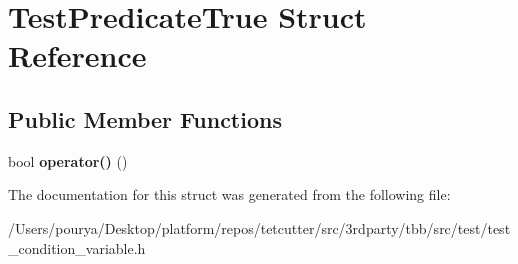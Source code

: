 \hypertarget{structTestPredicateTrue}{}\section{Test\+Predicate\+True Struct Reference}
\label{structTestPredicateTrue}
\subsection*{Public Member Functions}
\begin{DoxyCompactItemize}
\item 
\hypertarget{structTestPredicateTrue_a9887ffb73b4401d56c45b23501a75020}{}bool {\bfseries operator()} ()\label{structTestPredicateTrue_a9887ffb73b4401d56c45b23501a75020}

\end{DoxyCompactItemize}


The documentation for this struct was generated from the following file\+:\begin{DoxyCompactItemize}
\item 
/\+Users/pourya/\+Desktop/platform/repos/tetcutter/src/3rdparty/tbb/src/test/test\+\_\+condition\+\_\+variable.\+h\end{DoxyCompactItemize}
